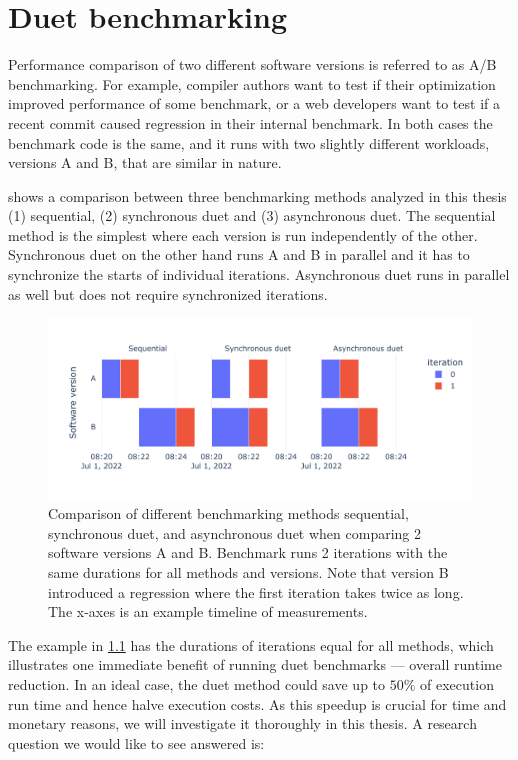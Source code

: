 \chapter{Duet benchmarking}
\label{chap:duet}

Performance comparison of two different software versions is referred to as A/B benchmarking.
For example, compiler authors want to test if their optimization improved performance of some benchmark, or a web developers want to test if a recent commit caused regression in their internal benchmark.
In both cases the benchmark code is the same, and it runs with two slightly different workloads, versions A and B, that are similar in nature.

 shows a comparison between three benchmarking methods analyzed in this thesis (1) sequential, (2) synchronous duet and (3) asynchronous duet.
The sequential method is the simplest where each version is run independently of the other.
Synchronous duet on the other hand runs A and B in parallel and it has to synchronize the starts of individual iterations.
Asynchronous duet runs in parallel as well but does not require synchronized iterations.

\begin{figure}
	\centering
	\includegraphics[width=.9\linewidth]{./figures/method_timeline.pdf}
	\caption{
	Comparison of different benchmarking methods sequential, synchronous duet, and asynchronous duet when comparing 2 software versions A and B.
	Benchmark runs 2 iterations with the same durations for all methods and versions.
	Note that version B introduced a regression where the first iteration takes twice as long.
	The \mbox{x-axes} is an example timeline of measurements.
	}
	\label{fig:method_timeline}
\end{figure}

The example in \cref{fig:method_timeline} has the durations of iterations equal for all methods, which illustrates one immediate benefit of running duet benchmarks --- overall runtime reduction.
In an ideal case, the duet method could save up to $50\%$ of execution run time and hence halve execution costs.
As this speedup is crucial for time and monetary reasons, we will investigate it thoroughly in this thesis.
A research question we would like to see answered is:

